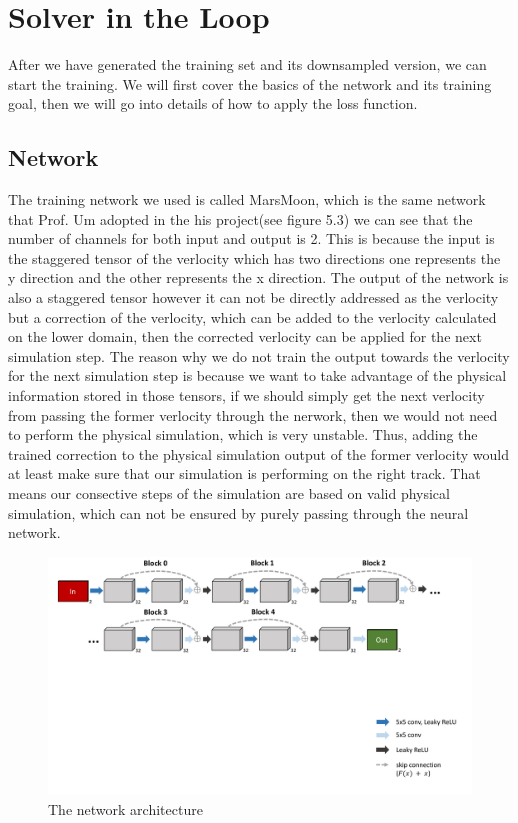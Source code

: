 \documentclass[a4paper,12pt,twoside]{report}
\begin{document}
\section{Solver in the Loop}
After we have generated the training set and its downsampled version, we can start the training. We will first cover the basics of the network and its training goal, then we will go into details of how to apply the loss function.
\subsection{Network}
The training network we used is called MarsMoon, which is the same network that Prof. Um adopted in the his project(see figure 5.3) we can see that the number of channels for both input and output is 2. This is because the input is the staggered tensor of the verlocity which has two directions one represents the y direction and the other represents the x direction. The output of the network is also a staggered tensor however it can not be directly addressed as the verlocity but a correction of the verlocity, which can be added to the verlocity calculated on the lower domain, then the corrected verlocity can be applied for the next simulation step. The reason why we do not train the output towards the verlocity for the next simulation step is because we want to take advantage of the physical information stored in those tensors, if we should simply get the next verlocity from passing the former verlocity through the nerwork, then we would not need to perform the physical simulation, which is very unstable. Thus, adding the trained correction to the physical simulation output of the former verlocity would at least make sure that our simulation is performing on the right track. That means our consective steps of the simulation are based on valid physical simulation, which can not be ensured by purely passing through the neural network.
\begin{figure}
\centering
\includegraphics[width=1.0\textwidth]{marsmoon.pdf}
\caption{The network architecture\cite{um2020sol}}
\end{figure}
\end{document}
